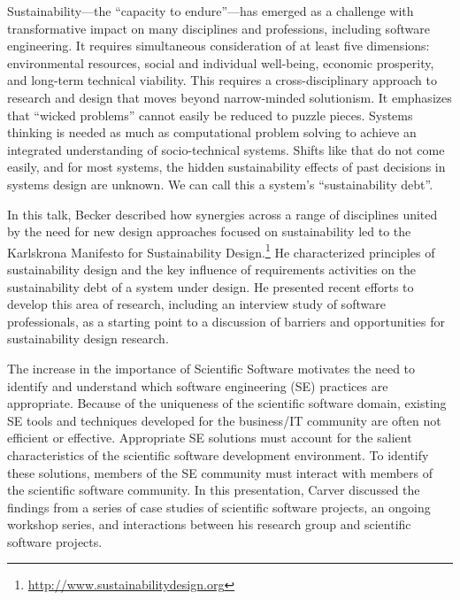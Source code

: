 \documentclass[a4paper,UKenglish]{dagrep}
\begin{document}
Sustainability---the ``capacity to endure''---has emerged as a challenge with transformative impact on many disciplines and professions, including software engineering. It requires simultaneous consideration of at least five dimensions: environmental resources, social and individual well-being, economic prosperity, and long-term technical viability. This requires a cross-disciplinary approach to research and design that moves beyond narrow-minded solutionism. It emphasizes that ``wicked problems'' cannot easily be reduced to puzzle pieces. Systems thinking is needed as much as computational problem solving to achieve an integrated understanding of socio-technical systems. Shifts like that do not come easily, and for most systems, the hidden sustainability effects of past decisions in systems design are unknown. We can call this a system's ``sustainability debt''.

In this talk, Becker described how synergies across a range of disciplines united by the need for new design approaches focused on sustainability led to the Karlskrona Manifesto for Sustainability Design.\footnote{\url{http://www.sustainabilitydesign.org}}
He characterized principles of sustainability design and the key influence of requirements activities on the sustainability debt of a system under design. He presented recent efforts to develop this area of research, including an interview study of software professionals, as a starting point to a discussion of barriers and opportunities for sustainability design research.


The increase in the importance of Scientific Software motivates the need to identify and understand which software engineering (SE) practices are appropriate. Because of the uniqueness of the scientific software domain, existing SE tools and techniques developed for the business/IT community are often not efficient or effective. Appropriate SE solutions must account for the salient characteristics of the scientific software development environment. To identify these solutions, members of the SE community must interact with members of the scientific software community. In this presentation, Carver discussed the findings from a series of case studies of scientific software projects, an ongoing workshop series, and interactions between his research group and scientific software projects.
\end{document}
